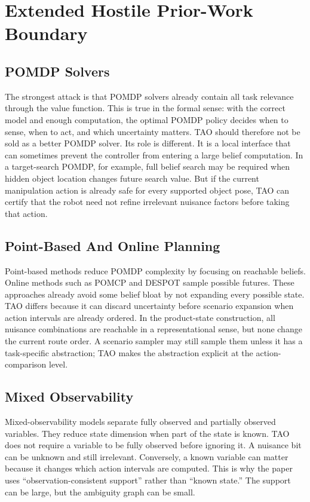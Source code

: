 \documentclass{article}
\begin{document}
\section{Extended Hostile Prior-Work Boundary}

\subsection{POMDP Solvers}

The strongest attack is that POMDP solvers already contain all task relevance through the value function. This is true in the formal sense: with the correct model and enough computation, the optimal POMDP policy decides when to sense, when to act, and which uncertainty matters. TAO should therefore not be sold as a better POMDP solver. Its role is different. It is a local interface that can sometimes prevent the controller from entering a large belief computation. In a target-search POMDP, for example, full belief search may be required when hidden object location changes future search value. But if the current manipulation action is already safe for every supported object pose, TAO can certify that the robot need not refine irrelevant nuisance factors before taking that action.

\subsection{Point-Based And Online Planning}

Point-based methods reduce POMDP complexity by focusing on reachable beliefs. Online methods such as POMCP and DESPOT sample possible futures. These approaches already avoid some belief bloat by not expanding every possible state. TAO differs because it can discard uncertainty before scenario expansion when action intervals are already ordered. In the product-state construction, all nuisance combinations are reachable in a representational sense, but none change the current route order. A scenario sampler may still sample them unless it has a task-specific abstraction; TAO makes the abstraction explicit at the action-comparison level.

\subsection{Mixed Observability}

Mixed-observability models separate fully observed and partially observed variables. They reduce state dimension when part of the state is known. TAO does not require a variable to be fully observed before ignoring it. A nuisance bit can be unknown and still irrelevant. Conversely, a known variable can matter because it changes which action intervals are computed. This is why the paper uses ``observation-consistent support'' rather than ``known state.'' The support can be large, but the ambiguity graph can be small.
\end{document}
